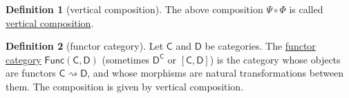 \documentclass[a4paper,10pt]{scrreprt}
\newcommand{\defn}[1]{\ul{#1}}
\theoremstyle{definition}
\newtheorem{definition}{Definition}[section]
\theoremstyle{plain}
\theoremstyle{remark}
\begin{document}
\begin{definition}[vertical composition]
  \label{def:verticalcomposition}
  The above composition $\Psi \circ \Phi$ is called \defn{vertical composition}.
\end{definition}

\begin{definition}[functor category]
  \label{def:functorcategory}
  Let $\mathsf{C}$ and $\mathsf{D}$ be categories. The \defn{functor category} $\mathsf{Func}(\mathsf{C}, \mathsf{D})$ (sometimes $\mathsf{D}^{\mathsf{C}}$ or $[\mathsf{C},\mathsf{D}]$) is the category whose objects are functors $\mathsf{C} \rightsquigarrow \mathsf{D}$, and whose morphisms are natural transformations between them. The composition is given by vertical composition.
\end{definition}
\end{document}
